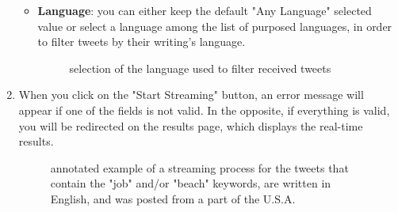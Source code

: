 \documentclass[a4paper,11pt]{report}
\begin{document}
\begin{enumerate}
\begin{itemize}
		\item \textbf{Language}: you can either keep the default "Any Language" selected value or select a language among the list of purposed languages, in order to filter tweets by their writing's language.
		\begin{figure}[H]
		\vspace{-5pt}
		\begin{center}
		\vspace{-5pt}
		\caption{selection of the language used to filter received tweets}
		\end{center}
		\end{figure}
		\vspace{-10pt}
	\end{itemize}
	\newpage
	
	\item When you click on the "Start Streaming" button, an error message will appear if one of the fields is not valid. In the opposite, if everything is valid, you will be redirected on the results page, which displays the real-time results.
	\begin{figure}[H]
	\vspace{-5pt}
	\begin{center}
	\vspace{-5pt}
	\caption{annotated example of a streaming process for the tweets that contain the "job" and/or "beach" keywords, are written in English, and was posted from a part of the U.S.A.}
	\end{center}
	\end{figure}
	\vspace{-10pt}
		

\end{enumerate}
\end{document}
